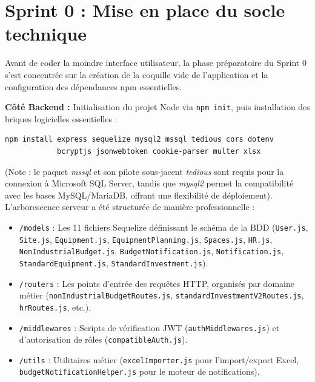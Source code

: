 \section{Sprint 0 : Mise en place du socle technique}
Avant de coder la moindre interface utilisateur, la phase préparatoire du Sprint 0 s'est concentrée sur la création de la coquille vide de l'application et la configuration des dépendances npm essentielles.

\textbf{Côté Backend :}
Initialisation du projet Node via \texttt{npm init}, puis installation des briques logicielles essentielles :
\begin{verbatim}
npm install express sequelize mysql2 mssql tedious cors dotenv
            bcryptjs jsonwebtoken cookie-parser multer xlsx
\end{verbatim}
(Note : le paquet \textit{mssql} et son pilote sous-jacent \textit{tedious} sont requis pour la connexion à Microsoft SQL Server, tandis que \textit{mysql2} permet la compatibilité avec les bases MySQL/MariaDB, offrant une flexibilité de déploiement).\newline
L'arborescence serveur a été structurée de manière professionnelle :
\begin{itemize}
    \item \texttt{/models} : Les 11 fichiers Sequelize définissant le schéma de la BDD (\texttt{User.js}, \texttt{Site.js}, \texttt{Equipment.js}, \texttt{EquipmentPlanning.js}, \texttt{Spaces.js}, \texttt{HR.js}, \texttt{NonIndustrialBudget.js}, \texttt{BudgetNotification.js}, \texttt{Notification.js}, \texttt{StandardEquipment.js}, \texttt{StandardInvestment.js}).
    \item \texttt{/routers} : Les points d'entrée des requêtes HTTP, organisés par domaine métier (\texttt{nonIndustrialBudgetRoutes.js}, \texttt{standardInvestmentV2Routes.js}, \texttt{hrRoutes.js}, etc.).
    \item \texttt{/middlewares} : Scripts de vérification JWT (\texttt{authMiddlewares.js}) et d'autorisation de rôles (\texttt{compatibleAuth.js}).
    \item \texttt{/utils} : Utilitaires métier (\texttt{excelImporter.js} pour l'import/export Excel, \texttt{budgetNotificationHelper.js} pour le moteur de notifications).
\end{itemize}

